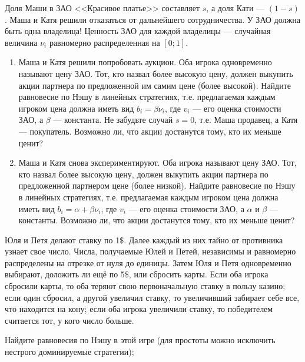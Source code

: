\begin{problem}
Доля Маши в ЗАО <<Красивое платье>> составляет  $s$, а доля Кати ---  $\left(1-s\right)$. Маша и Катя решили отказаться от дальнейшего сотрудничества. У ЗАО должна быть одна владелица!
Ценность ЗАО для каждой владелицы --- случайная величина  $\nu _{i} $  равномерно распределенная на  $\left[0;1\right]$.\par
\begin{enumerate}
\item	Маша и Катя решили попробовать аукцион. Оба игрока одновременно называют цену ЗАО. Тот, кто назвал более высокую цену, должен выкупить акции партнера по предложенной им самим цене (более высокой). Найдите равновесие по Нэшу в линейных стратегиях, т.е. предлагаемая каждым игроком цена должна иметь вид  $b_{i} =\beta \nu _{i} $, где  $v_{i} $  --- его оценка стоимости ЗАО, а   $\beta $  --- константа. Не забудьте случай  $s=0$, т.е. Маша продавец, а Катя --- покупатель. Возможно ли, что акции достанутся тому, кто их меньше ценит?\par
\item 	Маша и Катя снова экспериментируют. Оба игрока называют цену ЗАО. Тот, кто назвал более высокую цену, должен выкупить акции партнера по предложенной партнером цене (более низкой). Найдите равновесие по Нэшу в линейных стратегиях, т.е. предлагаемая каждым игроком цена должна иметь вид  $b_{i} =\alpha +\beta \nu _{i} $, где  $v_{i} $  --- его оценка стоимости ЗАО, а  $\alpha $  и  $\beta $  --- константы. Возможно ли, что акции достанутся тому, кто их меньше ценит?\par
\end{enumerate}


\begin{sol}

\end{sol}
\end{problem}



\begin{problem}
Юля и Петя делают ставку по 1\$. Далее каждый из них тайно от противника узнает свое число. Числа, получаемые Юлей и Петей, независимы и равномерно распределены на отрезке от нуля до единицы. Затем Юля и Петя одновременно выбирают, доложить ли ещё по 5\$, или сбросить карты. Если оба игрока сбросили карты, то оба теряют свою первоначальную ставку в пользу казино; если один сбросил, а другой увеличил ставку, то увеличивший забирает себе все, что находится на кону; если оба игрока увеличили ставку, то победителем считается тот, у кого число больше.\par
Найдите равновесия по Нэшу в этой игре (для простоты можно исключить нестрого доминируемые стратегии);\par



\begin{sol}

\end{sol}
\end{problem}



